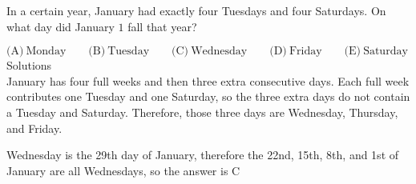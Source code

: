 

In a certain year, January had exactly four Tuesdays and four Saturdays. On what day did January $1$ fall that year?

$\text{(A)}\ \text{Monday} \qquad \text{(B)}\ \text{Tuesday} \qquad \text{(C)}\ \text{Wednesday} \qquad \text{(D)}\ \text{Friday} \qquad \text{(E)}\ \text{Saturday}$
\\
Solutions
\\
January has four full weeks and then three extra consecutive days. Each full week contributes one Tuesday and one Saturday, so the three extra days do not contain a Tuesday and Saturday. Therefore, those three days are Wednesday, Thursday, and Friday.

Wednesday is the 29th day of January, therefore the 22nd, 15th, 8th, and 1st of January are all Wednesdays, so the answer is $\boxed{\text{C}}$
